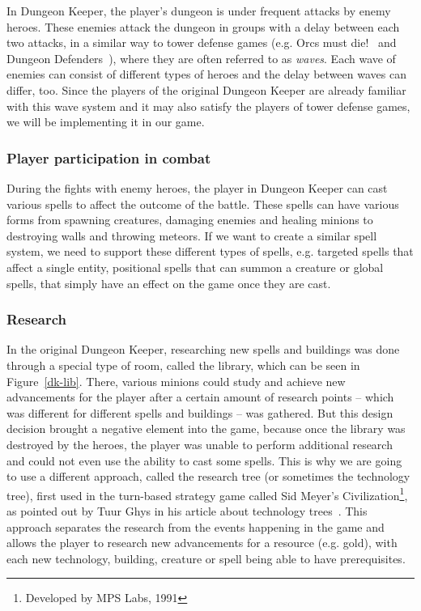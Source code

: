 In Dungeon Keeper, the player's dungeon is under frequent attacks by enemy heroes. These enemies attack the dungeon 
in groups with a delay between each two attacks, in a similar way to tower defense games (e.g. Orcs must die!~\cite{OMD} 
and Dungeon Defenders~\cite{DungeonDefenders}), where they are often referred to as \emph{waves}. Each wave of enemies
can consist of different types of heroes and the delay between waves can differ, too. Since the players of the original
Dungeon Keeper are already familiar with this wave system and it may also satisfy the players of tower defense games, we will be
implementing it in our game.

\subsubsection{Player participation in combat}

During the fights with enemy heroes, the player in Dungeon Keeper can cast various spells to affect the outcome of the battle.
These spells can have various forms from spawning creatures, damaging enemies and healing minions to destroying walls and throwing
meteors. If we want to create a similar spell system, we need to support these different types of spells, e.g. targeted spells that
affect a single entity, positional spells that can summon a creature or global spells, that simply have an effect on the game once
they are cast.

\subsubsection{Research}

In the original Dungeon Keeper, researching new spells and buildings was done through a special type of room, called the library,
which can be seen in Figure~\ref{dk-lib}. There,
various minions could study and achieve new advancements for the player after a certain amount of research points -- which was different
for different spells and buildings -- was gathered. But this design decision brought a negative element into the game, because once the
library was destroyed by the heroes, the player was unable to perform additional research and could not even use the ability to cast
some spells. This is why we are going to use a different approach, called the research tree (or sometimes the technology tree), first used
in the turn-based strategy game called Sid Meyer's Civilization\footnote{Developed by MPS Labs, 1991}, as pointed out by Tuur Ghys in his
article about technology trees~\cite{ResearchTrees}. This approach 
separates the research from the events happening in the game and allows the player to research new advancements for a resource (e.g. gold),
with each new technology, building, creature or spell being able to have prerequisites.

